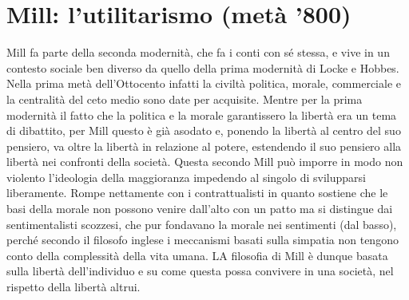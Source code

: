 \documentclass[10pt,a4paper]{article}
\begin{document}
\section{Mill: l'utilitarismo (metà '800)}
Mill fa parte della seconda modernità, che fa i conti con sé stessa, e vive in un contesto sociale ben diverso da quello della prima modernità di Locke e Hobbes. Nella prima metà dell'Ottocento infatti la civiltà politica, morale, commerciale e la centralità del ceto medio sono date per acquisite. Mentre per la prima modernità il fatto che la politica e la morale garantissero la libertà era un tema di dibattito, per Mill questo è già asodato e, ponendo la libertà al centro del suo pensiero, va oltre la libertà in relazione al potere, estendendo il suo pensiero alla libertà nei confronti della società. Questa secondo Mill può imporre in modo non violento l'ideologia della maggioranza impedendo al singolo di svilupparsi liberamente. Rompe nettamente con i contrattualisti in quanto sostiene che le basi della morale non possono venire dall'alto con un patto ma si distingue dai sentimentalisti scozzesi, che pur fondavano la morale nei sentimenti (dal basso), perché secondo il filosofo inglese i meccanismi basati sulla simpatia non tengono conto della complessità della vita umana. LA filosofia di Mill è dunque basata sulla libertà dell'individuo e su come questa possa convivere in una società, nel rispetto della libertà altrui.
\end{document}
